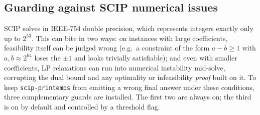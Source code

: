 \documentclass[conference]{IEEEtran}
\begin{document}
\subsection{Guarding against SCIP numerical issues}\label{sec:scip-guards}
SCIP solves in IEEE-754 double precision, which represents integers exactly only up to $2^{53}$. This can bite in two ways: on instances with large coefficients, feasibility itself can be judged wrong (e.g.\ a constraint of the form $a - b \ge 1$ with $a, b \approx 2^{64}$ loses the $\pm 1$ and looks trivially satisfiable); and even with smaller coefficients, LP relaxations can run into numerical instability mid-solve, corrupting the dual bound and any optimality or infeasibility \emph{proof} built on it. To keep \texttt{scip-printemps} from emitting a wrong final answer under these conditions, three complementary guards are installed. The first two are always on; the third is on by default and controlled by a threshold flag.
\end{document}
